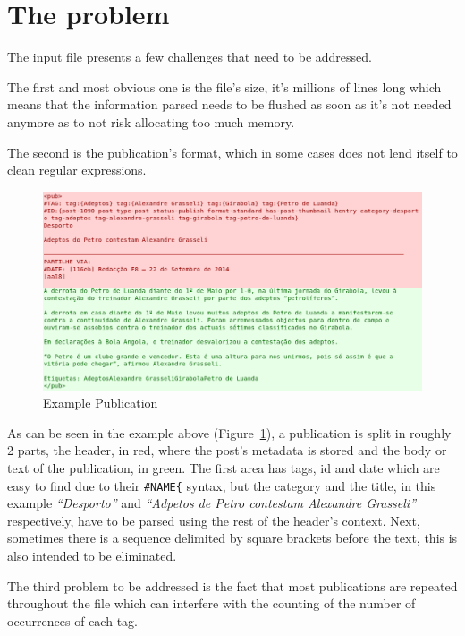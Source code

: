 \documentclass[a4paper]{article}
\begin{document}
\section{The problem}

The input file presents a few challenges that need to be addressed.

The first and most obvious one is the file's size, it's millions of lines long
which means that the information parsed needs to be flushed as soon as it's not
needed anymore as to not risk allocating too much memory.

The second is the publication's format, which in some cases does not lend
itself to clean regular expressions.

\begin{figure}[H]
    \includegraphics[width=\textwidth]{./example_pub_colored_simple.png}
    \caption{Example Publication}\label{fig:example_pub_simple}
\end{figure}

As can be seen in the example above (Figure~\ref{fig:example_pub_simple}), a
publication is split in roughly 2 parts, the header, in red, where the post's
metadata is stored and the body or text of the publication, in green. The first
area has tags, id and date which are easy to find due to their
\texttt{\#NAME\{} syntax, but the category and the title, in this example
\textit{``Desporto''} and \textit{``Adpetos de Petro contestam Alexandre
Grasseli''} respectively, have to be parsed using the rest of the header's
context. Next, sometimes there is a sequence delimited by square brackets before
the text, this is also intended to be eliminated.

The third problem to be addressed is the fact that most publications
are repeated throughout the file which can interfere with the counting of the
number of occurrences of each tag.
\end{document}
